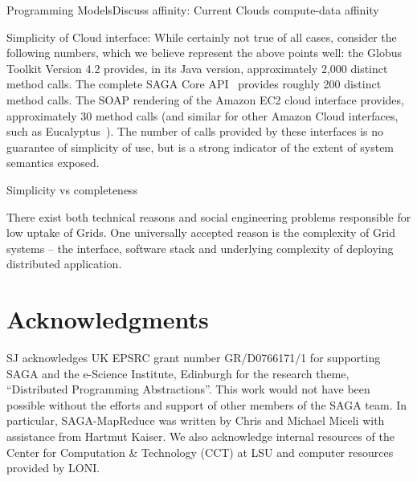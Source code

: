 \documentclass[conference,final]{IEEEtran}
\newcommand{\sagamapreduce }{SAGA-MapReduce }
\begin{document}
Programming ModelsDiscuss affinity: Current Clouds compute-data affinity 

Simplicity of Cloud interface: While certainly not true of all cases,
consider the following numbers, which we believe represent the above
points well: the Globus Toolkit Version 4.2 provides, in its Java
version, approximately 2,000 distinct method calls.  The complete SAGA
Core API~\cite{saga_gfd90} provides roughly 200 distinct method calls.
The SOAP rendering of the Amazon EC2 cloud interface provides,
approximately 30 method calls (and similar for other Amazon Cloud
interfaces, such as Eucalyptus~\cite{eucalyptus_url}).  The number of
calls provided by these interfaces is no guarantee of simplicity of
use, but is a strong indicator of the extent of system semantics
exposed.

Simplicity vs completeness

There exist both technical reasons and social engineering problems
responsible for low uptake of Grids. One universally accepted reason
is the complexity of Grid systems -- the interface, software stack and
underlying complexity of deploying distributed application.




\section{Acknowledgments}

SJ acknowledges UK EPSRC grant number GR/D0766171/1 for supporting
SAGA and the e-Science Institute, Edinburgh for the research theme,
``Distributed Programming Abstractions''.  This work would not have
been possible without the efforts and support of other members of the
SAGA team.  In particular, \sagamapreduce was written by Chris and
Michael Miceli with assistance from Hartmut Kaiser.  We also
acknowledge internal resources of the Center for Computation \&
Technology (CCT) at LSU and computer resources provided by LONI.
 
\end{document}
